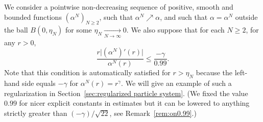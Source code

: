 \documentclass[11pt,a4paper]{article}
\theoremstyle{definition}
\theoremstyle{plain}
\begin{document}
We consider a pointwise non-decreasing sequence of positive, smooth and bounded functions $(\alpha^N)_{N\geq 2}$, such that $\alpha^N \nearrow \alpha$, and such that $\alpha=\alpha^N$ outside the ball $B(0,\eta_N)$ for some $\eta_N \xrightarrow[N\rightarrow\infty]{} 0$. We also suppose that for each $N\geq 2$, for any $r>0$,
\begin{equation}
\label{eq:fishercond}
    \frac{r \vert (\alpha^{N})'(r) \vert}{\alpha^{N}(r)}\leq \frac{-\gamma}{0.99}.
\end{equation}
Note that this condition is automatically satisfied for $r> \eta_N$ because the left-hand side equals $-\gamma$ for $\alpha^N(r)=r^\gamma$. We will give an example of such a regularization in Section~\ref{sec:regularized particle system}. (We fixed the value $0.99$ for nicer explicit constants in estimates but it can be lowered to anything strictly greater than $(-\gamma)/\sqrt{22}$, see Remark~\ref{rem:on0.99}.)
\end{document}
